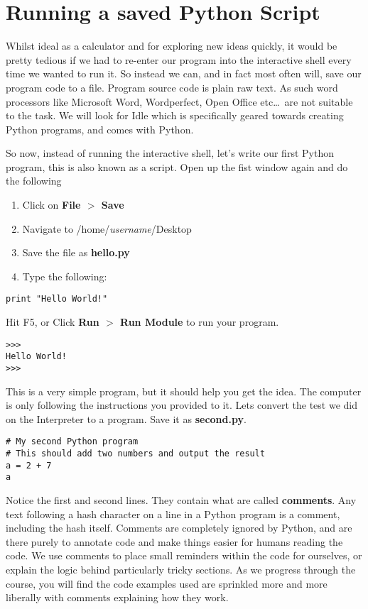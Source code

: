 \section{Running a saved Python Script}

Whilst ideal as a calculator and for exploring new ideas quickly, it   would be pretty tedious if we had to re-enter our program into the   interactive shell every time we wanted to run it. So instead we can,   and in fact most often will, save our program code to a file. Program   source code is plain raw text. As such word processors like Microsoft   Word, Wordperfect, Open Office etc\ldots\ are not suitable to the task. We will   look for Idle which is specifically geared towards creating Python programs,   and comes with   Python. 

So now, instead of running the interactive shell, let's write our   first Python program, this is also known as a script. Open up the fist   window again and do the following
\begin{enumerate}
    \item Click on \textbf{File $>$ Save}
    \item Navigate to /home/\textit{username}/Desktop
    \item Save the file as \textbf{hello.py}
    \item Type the following:
\end{enumerate}
\begin{lstlisting}
print "Hello World!"
\end{lstlisting}

Hit F5, or Click \textbf{Run $>$ Run Module} to    run your program.


\begin{lstlisting}
>>>
Hello World!
>>>
\end{lstlisting}

This is a very simple program, but it should help you get the    idea. The computer is only following the instructions you provided   to it. Lets convert the test we did on the Interpreter to a program.   Save it as \textbf{second.py}.   
\begin{lstlisting}
# My second Python program
# This should add two numbers and output the result
a = 2 + 7
a
\end{lstlisting}

Notice the first and second lines. They contain what are called   \textbf{comments}. Any text following a hash character on a   line in a Python program is a comment, including the hash itself.   Comments are completely ignored by Python, and are there purely to   annotate code and make things easier for humans reading the code. We   use comments to place small reminders within the code for ourselves, or   explain the logic behind particularly tricky sections. As we   progress through the course, you will find the code examples used are   sprinkled more and more liberally with comments explaining how they   work.

